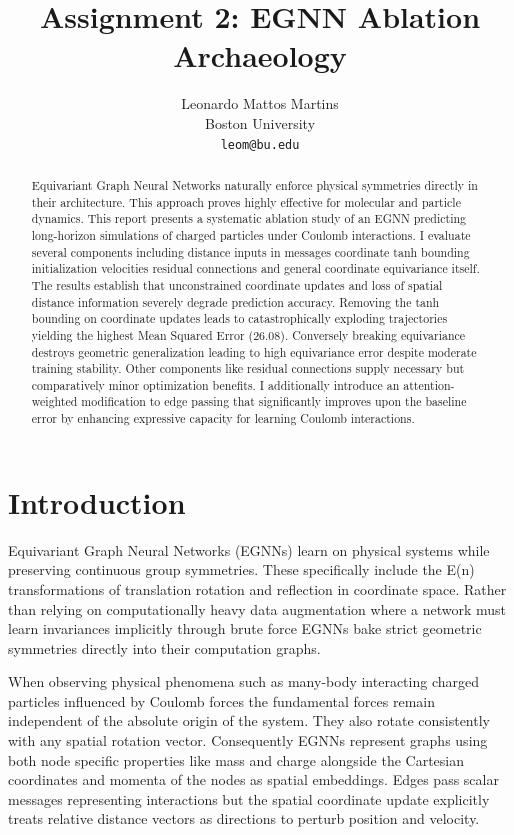 \documentclass{article}
\title{Assignment 2: EGNN Ablation Archaeology}
\author{%
  Leonardo Mattos Martins \\
  Boston University \\
  \texttt{leom@bu.edu}
}
\begin{document}
\maketitle

\begin{abstract}
Equivariant Graph Neural Networks naturally enforce physical symmetries directly in their architecture. This approach proves highly effective for molecular and particle dynamics. This report presents a systematic ablation study of an EGNN predicting long-horizon simulations of charged particles under Coulomb interactions. I evaluate several components including distance inputs in messages coordinate tanh bounding initialization velocities residual connections and general coordinate equivariance itself. The results establish that unconstrained coordinate updates and loss of spatial distance information severely degrade prediction accuracy. Removing the tanh bounding on coordinate updates leads to catastrophically exploding trajectories yielding the highest Mean Squared Error (26.08). Conversely breaking equivariance destroys geometric generalization leading to high equivariance error despite moderate training stability. Other components like residual connections supply necessary but comparatively minor optimization benefits. I additionally introduce an attention-weighted modification to edge passing that significantly improves upon the baseline error by enhancing expressive capacity for learning Coulomb interactions.
\end{abstract}

\section{Introduction}

Equivariant Graph Neural Networks (EGNNs) learn on physical systems while preserving continuous group symmetries. These specifically include the E(n) transformations of translation rotation and reflection in coordinate space. Rather than relying on computationally heavy data augmentation where a network must learn invariances implicitly through brute force EGNNs bake strict geometric symmetries directly into their computation graphs. 

When observing physical phenomena such as many-body interacting charged particles influenced by Coulomb forces the fundamental forces remain independent of the absolute origin of the system. They also rotate consistently with any spatial rotation vector. Consequently EGNNs represent graphs using both node specific properties like mass and charge alongside the Cartesian coordinates and momenta of the nodes as spatial embeddings. Edges pass scalar messages representing interactions but the spatial coordinate update explicitly treats relative distance vectors as directions to perturb position and velocity. 
\end{document}

